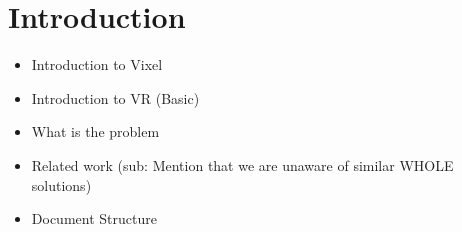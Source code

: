 \section{Introduction}
\begin{itemize}
    \item Introduction to Vixel
    \item Introduction to VR (Basic)
    \item What is the problem
    \item Related work (sub: Mention that we are unaware of similar WHOLE solutions)
    \item Document Structure
\end{itemize}